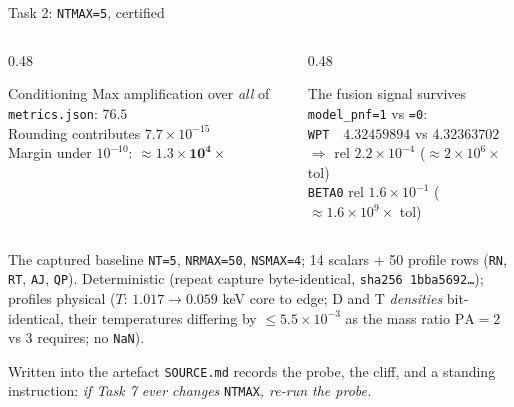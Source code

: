 \documentclass[10pt,aspectratio=169]{beamer}
\newcommand{\C}[1]{\texttt{\small #1}}          %
\begin{document}
\begin{frame}{Task 2: \C{NTMAX=5}, certified}

\begin{columns}[T]
\begin{column}{0.48\textwidth}
\begin{exampleblock}{Conditioning}
Max amplification over \emph{all} of \C{metrics.json}: $\mathbf{76.5}$\\[0.3em]
Rounding contributes $7.7\times10^{-15}$\\[0.3em]
Margin under $10^{-10}$: $\mathbf{\approx 1.3\times10^{4}\times}$
\end{exampleblock}
\end{column}
\begin{column}{0.48\textwidth}
\begin{exampleblock}{The fusion signal survives}
\C{model\_pnf=1} vs \C{=0}:\\[0.2em]
\C{WPT}\ \ $4.32459894$ vs $4.32363702$\\
\hspace*{1em}$\Rightarrow$ rel $2.2\times10^{-4}$ ($\approx 2\times10^{6}\times$ tol)\\[0.2em]
\C{BETA0} rel $1.6\times10^{-1}$ ($\approx 1.6\times10^{9}\times$ tol)
\end{exampleblock}
\end{column}
\end{columns}

\vspace{0.4em}
\begin{block}{The captured baseline}
\C{NT=5}, \C{NRMAX=50}, \C{NSMAX=4}; 14 scalars + 50 profile rows (\C{RN}, \C{RT}, \C{AJ}, \C{QP}).
Deterministic (repeat capture byte-identical, \C{sha256 1bba5692\ldots}); profiles physical
($T$: $1.017 \to 0.059$ keV core to edge; D and T \emph{densities} bit-identical, their temperatures
differing by $\le 5.5\times10^{-3}$ as the mass ratio $\mathrm{PA}=2$ vs $3$ requires; no \C{NaN}).
\end{block}

\vspace{0.2em}
\begin{block}{Written into the artefact}
\C{SOURCE.md} records the probe, the cliff, and a standing instruction: \emph{if Task 7 ever changes}
\C{NTMAX}\emph{, re-run the probe.}
\end{block}
\end{frame}
\end{document}

